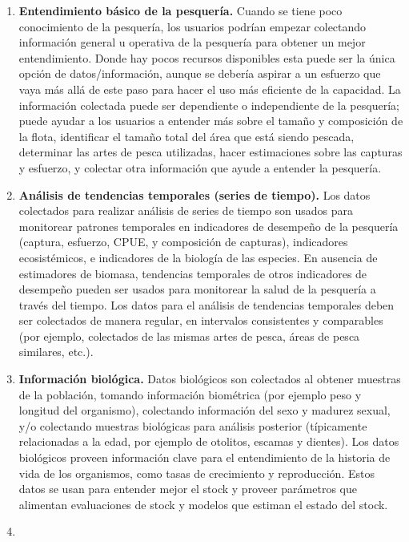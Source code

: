 \documentclass[
  11pt,
]{book}
\providecommand{\tightlist}{%
  \setlength{\itemsep}{0pt}\setlength{\parskip}{0pt}}
\begin{document}
\begin{itemize}
\begin{itemize}
    \begin{enumerate}
    \def\labelenumi{\alph{enumi}.}
    \tightlist
    \item
      \textbf{Entendimiento básico de la pesquería.} Cuando se tiene poco conocimiento de la pesquería, los usuarios podrían empezar colectando información general u operativa de la pesquería para obtener un mejor entendimiento. Donde hay pocos recursos disponibles esta puede ser la única opción de datos/información, aunque se debería aspirar a un esfuerzo que vaya más allá de este paso para hacer el uso más eficiente de la capacidad. La información colectada puede ser dependiente o independiente de la pesquería; puede ayudar a los usuarios a entender más sobre el tamaño y composición de la flota, identificar el tamaño total del área que está siendo pescada, determinar las artes de pesca utilizadas, hacer estimaciones sobre las capturas y esfuerzo, y colectar otra información que ayude a entender la pesquería.
    \item
      \textbf{Análisis de tendencias temporales (series de tiempo).} Los datos colectados para realizar análisis de series de tiempo son usados para monitorear patrones temporales en indicadores de desempeño de la pesquería (captura, esfuerzo, CPUE, y composición de capturas), indicadores ecosistémicos, e indicadores de la biología de las especies. En ausencia de estimadores de biomasa, tendencias temporales de otros indicadores de desempeño pueden ser usados para monitorear la salud de la pesquería a través del tiempo. Los datos para el análisis de tendencias temporales deben ser colectados de manera regular, en intervalos consistentes y comparables (por ejemplo, colectados de las mismas artes de pesca, áreas de pesca similares, etc.).
    \item
      \textbf{Información biológica.} Datos biológicos son colectados al obtener muestras de la población, tomando información biométrica (por ejemplo peso y longitud del organismo), colectando información del sexo y madurez sexual, y/o colectando muestras biológicas para análisis posterior (típicamente relacionadas a la edad, por ejemplo de otolitos, escamas y dientes). Los datos biológicos proveen información clave para el entendimiento de la historia de vida de los organismos, como tasas de crecimiento y reproducción. Estos datos se usan para entender mejor el stock y proveer parámetros que alimentan evaluaciones de stock y modelos que estiman el estado del stock.
    \item

\end{enumerate}
\end{itemize}
\end{itemize}
\end{document}
